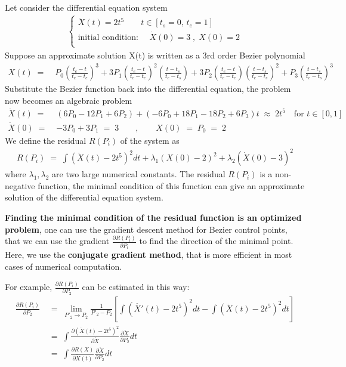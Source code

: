 \documentclass[12pt]{article}
\begin{document}
Let consider the differential equation system
%
\begin{align*}
	\left\{ \begin{array}{c}
		\ddot{X}(t) = 2 t^5 \qquad t \in [t_s=0,\, t_e=1]\\
		\textrm{initial condition: } \quad \dot{X}(0) = 3 \;,\; X(0) = 2 \\
	\end{array} \right.
\end{align*}
%
Suppose an approximate solution X(t) is written as a 3rd order Bezier polynomial
%
\begin{align*}
	X(t) \;=\; & P_{0} \left( \frac{t_{e}-t}{t_{e}-t_{e}} \right)^3 + 3 P_{1} \left( \frac{t_{e}-t}{t_{e}-t_{e}} \right)^2 \left( \frac{t-t_{s}}{t_{e}-t_{s}} \right) + 3 P_{2} \left( \frac{t_{e}-t}{t_{e}-t_{e}} \right) \left( \frac{t-t_{s}}{t_{e}-t_{s}} \right)^2 + P_{3} \left( \frac{t-t_{s}}{t_{e}-t_{s}} \right)^3
\end{align*}
%
Substitute the Bezier function back into the differential equation, the problem now becomes an algebraic problem
%
\begin{align*}
	\ddot{X}(t) \;=\; & \left( 6P_0 - 12P_1 + 6P_2 \right) + \left( -6P_0 + 18P_1 - 18P_2 + 6P_3 \right) t \;\approx\; 2 t^5 \quad \textrm{for $t\in[0,1]$} \\
	\dot{X}(0) \;=\; & - 3P_0 + 3P_1 \;=\; 3 \qquad,\qquad X(0) \;=\; P_0 \;=\; 2
\end{align*}
%
We define the residual $R(P_i)$ of the system as 
%
\begin{align}
	R(P_i) \;=\; \int \left( \ddot{X}(t)-2t^5 \right)^2 dt + \lambda_1 (X(0)-2)^2 + \lambda_2 (\dot{X}(0)-3)^2
\end{align}
%
where $\lambda_1,\lambda_2$ are two large numerical constants.
The residual $R(P_i)$ is a non-negative function, the minimal condition of this function can give an approximate solution of the differential equation system.


\textbf{Finding the minimal condition of the residual function is an optimized problem}, one can use the gradient descent method for Bezier control points, that we can use the gradient $\frac{\partial R(P_i)}{\partial P_i}$ to find the direction of the minimal point.
Here, we use the \textbf{conjugate gradient method}, that is more efficient in most cases of numerical computation.\cite{Shewchuk:1994}


For example, $\frac{\partial R(P_i)}{\partial P_2}$ can be estimated in this way:
%
\begin{align*}
	\frac{\partial R(P_i)}{\partial P_2} & \;=\; \lim_{P'_2\to P_2} \frac{1}{P'_2 - P_2}\left[ \int \left( \ddot{X'}(t)-2t^5 \right)^2 dt - \int \left( \ddot{X}(t)-2t^5 \right)^2 dt \right]  \\
	& \;=\; \int \frac{\partial \left( \ddot{X}(t)-2t^5 \right)^2}{\partial \ddot{X}} \frac{\partial \ddot{X}}{\partial P_2} dt \\
	& \;=\; \int \frac{\partial R(X)}{\partial \ddot{X}(t)} \frac{\partial \ddot{X}}{\partial P_2} dt
\end{align*}
\end{document}
